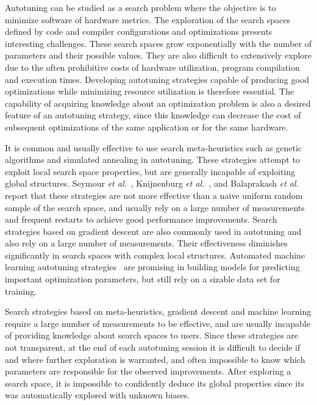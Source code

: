 \documentclass[conference]{IEEEtran}
\begin{document}
Autotuning can be studied as a search problem where the objective is to minimize
software of hardware metrics. The exploration of the search spaces defined by
code and compiler configurations and optimizations presents interesting
challenges. These search spaces grow exponentially with the number of parameters
and their possible values. They are also difficult to extensively explore due to
the often prohibitive costs of hardware utilization, program compilation and
execution times. Developing autotuning strategies capable of producing good
optimizations while minimizing resource utilization is therefore essential. The
capability of acquiring knowledge about an optimization problem is also a
desired feature of an autotuning strategy, since this knowledge can decrease the
cost of subsequent optimizations of the same application or for the same
hardware.

It is common and usually effective to use search meta-heuristics such as genetic
algorithms and simulated annealing in autotuning. These strategies attempt to
exploit local search space properties, but are generally incapable of exploiting
global structures. Seymour \emph{et al.}~\cite{seymour2008comparison},
Knijnenburg \emph{et al.}~\cite{knijnenburg2003combined}, and Balaprakash \emph{et
al.}~\cite{balaprakash2011can,balaprakash2012experimental} report that
these strategies are not more effective than a naive uniform random sample of
the search space, and usually rely on a large number of measurements and
frequent restarts to achieve good performance improvements. Search strategies
based on gradient descent are also commonly used in autotuning and also rely on
a large number of measurements. Their effectiveness diminishes significantly in
search spaces with complex local structures. Automated machine learning
autotuning
strategies~\cite{beckingsale2017apollo,falch2017machine,balaprakash2016automomml}
are promising in building models for predicting important optimization
parameters, but still rely on a sizable data set for training.

Search strategies based on meta-heuristics, gradient descent and machine
learning require a large number of measurements to be effective, and are usually
incapable of providing knowledge about search spaces to users. Since these
strategies are not transparent, at the end of each autotuning session it is
difficult to decide if and where further exploration is warranted, and often
impossible to know which parameters are responsible for the observed
improvements. After exploring a search space, it is impossible to confidently
deduce its global properties since its was automatically explored with unknown
biases.
\end{document}
